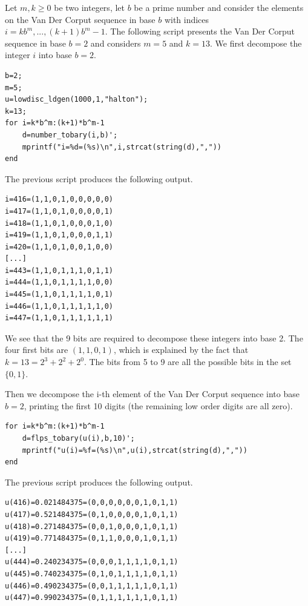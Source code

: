 Let $m,k\geq 0$ be two integers, let $b$ be 
a prime number and consider the 
elements on the Van Der Corput sequence in base $b$ 
with indices $i=kb^m,...,(k+1)b^m-1$. 
The following script presents the Van Der Corput 
sequence in base $b=2$ and considers $m=5$ and $k=13$. 
We first decompose the integer $i$ into base $b=2$. 

\lstset{language=scilabscript}
\begin{lstlisting}
b=2;
m=5;
u=lowdisc_ldgen(1000,1,"halton");
k=13;
for i=k*b^m:(k+1)*b^m-1
    d=number_tobary(i,b)';
    mprintf("i=%d=(%s)\n",i,strcat(string(d),","))
end
\end{lstlisting}

The previous script produces the following output. 
\lstset{language=scilabscript}
\begin{lstlisting}
i=416=(1,1,0,1,0,0,0,0,0)
i=417=(1,1,0,1,0,0,0,0,1)
i=418=(1,1,0,1,0,0,0,1,0)
i=419=(1,1,0,1,0,0,0,1,1)
i=420=(1,1,0,1,0,0,1,0,0)
[...]
i=443=(1,1,0,1,1,1,0,1,1)
i=444=(1,1,0,1,1,1,1,0,0)
i=445=(1,1,0,1,1,1,1,0,1)
i=446=(1,1,0,1,1,1,1,1,0)
i=447=(1,1,0,1,1,1,1,1,1)
\end{lstlisting}

We see that the 9 bits are required to decompose these 
integers into base 2. 
The four first bits are $(1,1,0,1)$, which 
is explained by the fact that $k=13=2^3+2^2+2^0$. 
The bits from 5 to 9 are all the possible bits in the set $\{0,1\}$. 

Then we decompose the i-th element of the Van Der Corput sequence 
 into base $b=2$, printing the first 10 digits 
(the remaining low order digits are all zero).

\lstset{language=scilabscript}
\begin{lstlisting}
for i=k*b^m:(k+1)*b^m-1
    d=flps_tobary(u(i),b,10)';
    mprintf("u(i)=%f=(%s)\n",u(i),strcat(string(d),","))
end
\end{lstlisting}

The previous script produces the following output. 

\lstset{language=scilabscript}
\begin{lstlisting}
u(416)=0.021484375=(0,0,0,0,0,0,1,0,1,1)
u(417)=0.521484375=(0,1,0,0,0,0,1,0,1,1)
u(418)=0.271484375=(0,0,1,0,0,0,1,0,1,1)
u(419)=0.771484375=(0,1,1,0,0,0,1,0,1,1)
[...]
u(444)=0.240234375=(0,0,0,1,1,1,1,0,1,1)
u(445)=0.740234375=(0,1,0,1,1,1,1,0,1,1)
u(446)=0.490234375=(0,0,1,1,1,1,1,0,1,1)
u(447)=0.990234375=(0,1,1,1,1,1,1,0,1,1)
\end{lstlisting}

